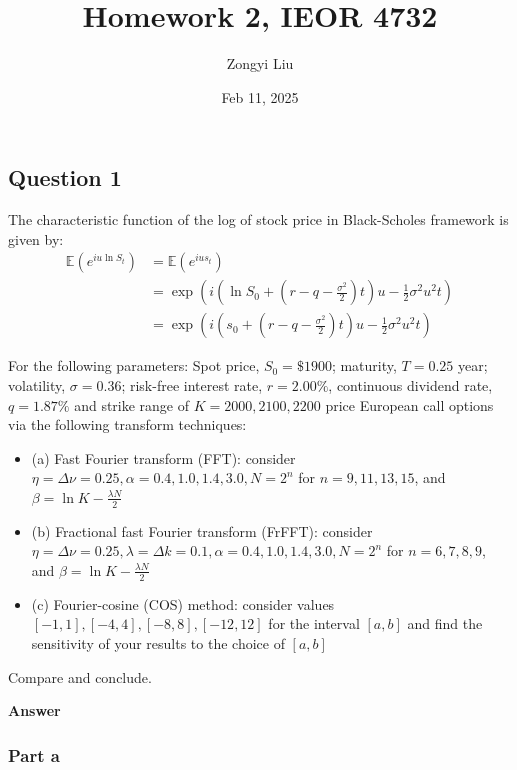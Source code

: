 \documentclass[margin=1in]{article}
\title{Homework 2, IEOR 4732}
\author{Zongyi Liu}
\date{Feb 11, 2025}
\begin{document}
		\maketitle
		
		\subsection*{Question 1}
		 The characteristic function of the log of stock price in Black-Scholes framework is given by:
		$$
		\begin{aligned}
			\mathbb{E}\left(e^{i u \ln S_t}\right) & =\mathbb{E}\left(e^{i u s_t}\right) \\
			& =\exp \left(i\left(\ln S_0+\left(r-q-\frac{\sigma^2}{2}\right) t\right) u-\frac{1}{2} \sigma^2 u^2 t\right) \\
			& =\exp \left(i\left(s_0+\left(r-q-\frac{\sigma^2}{2}\right) t\right) u-\frac{1}{2} \sigma^2 u^2 t\right)
		\end{aligned}
		$$
		
		For the following parameters:
		Spot price, $S_0=\$ 1900$; maturity, $T=0.25$ year; volatility, $\sigma=0.36$; risk-free interest rate, $r=2.00 \%$, continuous dividend rate, $q=1.87 \%$ and strike range of $K=2000,2100,2200$ price European call options via the following transform techniques:
		
		\begin{itemize}
		\item 	(a) Fast Fourier transform (FFT): consider $\eta=\Delta \nu=0.25, \alpha=0.4,1.0,1.4,3.0, N=2^n$ for $n=9,11,13,15$, and $\beta=\ln K-\frac{\lambda N}{2}$
		\item 	(b) Fractional fast Fourier transform (FrFFT): consider $\eta=\Delta \nu=0.25, \lambda=\Delta k=0.1, \alpha=0.4,1.0,1.4,3.0, N=2^n$ for $n=6,7,8,9$, and $\beta=\ln K-\frac{\lambda N}{2}$
		\item 	(c) Fourier-cosine (COS) method: consider values $[-1,1],[-4,4],[-8,8],[-12,12]$ for the interval $[a, b]$ and find the sensitivity of your results to the choice of $[a, b]$
		\end{itemize}
		
		Compare and conclude.

	\textbf{Answer}
	
	  \subsubsection*{Part a}
	  
\end{document}
